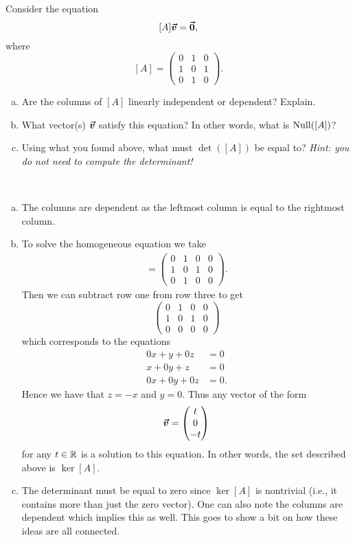 \documentclass[12pt]{article} %
\begin{document}
\newpage
\begin{problem}
Consider the equation
\[
[A]\boldsymbol{\vec{v}} = \boldsymbol{\vec{0}},
\]
where
\[
[A] = \begin{pmatrix} 0 & 1 & 0 \\ 1 & 0 & 1 \\ 0 & 1 & 0 \end{pmatrix}.
\]
\begin{enumerate}[(a)]
    \item Are the columns of $[A]$ linearly independent or dependent? Explain.
    \item What vector(s) $\boldsymbol{\vec{v}}$ satisfy this equation? In other words, what is $\mathrm{Null}([A])$?
    \item Using what you found above, what must $\det([A])$ be equal to? \emph{Hint: you do not need to compute the determinant!}
\end{enumerate}
\end{problem}
\begin{solution}~
\begin{enumerate}[(a)]
    \item The columns are dependent as the leftmost column is equal to the rightmost column.
    \item To solve the homogeneous equation we take
    \begin{align*}
        [M]=\left(\begin{array}{ccc|c}
            0 & 1 & 0 &0 \\
            1 & 0 & 1 &0\\
            0 & 1 & 0 &0
        \end{array}\right).
    \end{align*}
    Then we can subtract row one from row three to get
    \[
    \left(\begin{array}{ccc|c}
            0 & 1 & 0 &0\\
            1 & 0 & 1 &0\\
            0 & 0 & 0 &0
        \end{array}\right)
    \]
    which corresponds to the equations
    \begin{align*}
        0x+y+0z&=0\\
        x+0y+z&=0\\
        0x+0y+0z&=0.
    \end{align*}
    Hence we have that $z=-x$ and $y=0$.  Thus any vector of the form
    \[
    \boldsymbol{\vec{v}} = \begin{pmatrix} t \\ 0 \\ -t \end{pmatrix}
    \]
    for any $t\in \mathbb{R}$ is a solution to this equation. In other words, the set described above is $\ker[A]$.
    \item The determinant must be equal to zero since $\ker[A]$ is nontrivial (i.e., it contains more than just the zero vector). One can also note the columns are dependent which implies this as well.  This goes to show a bit on how these ideas are all connected.
\end{enumerate}
\end{solution}
\end{document}
